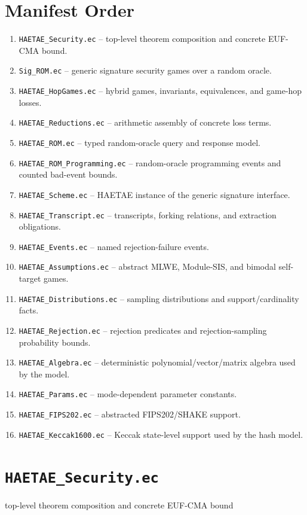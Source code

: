 \documentclass[10pt]{article}
\newcommand{\file}[1]{\nolinkurl{#1}}
\begin{document}
\section{Manifest Order}
\begin{enumerate}
\item \file{HAETAE\_Security.ec} -- top-level theorem composition and concrete EUF-CMA bound.
\item \file{Sig\_ROM.ec} -- generic signature security games over a random oracle.
\item \file{HAETAE\_HopGames.ec} -- hybrid games, invariants, equivalences, and game-hop losses.
\item \file{HAETAE\_Reductions.ec} -- arithmetic assembly of concrete loss terms.
\item \file{HAETAE\_ROM.ec} -- typed random-oracle query and response model.
\item \file{HAETAE\_ROM\_Programming.ec} -- random-oracle programming events and counted bad-event bounds.
\item \file{HAETAE\_Scheme.ec} -- HAETAE instance of the generic signature interface.
\item \file{HAETAE\_Transcript.ec} -- transcripts, forking relations, and extraction obligations.
\item \file{HAETAE\_Events.ec} -- named rejection-failure events.
\item \file{HAETAE\_Assumptions.ec} -- abstract MLWE, Module-SIS, and bimodal self-target games.
\item \file{HAETAE\_Distributions.ec} -- sampling distributions and support/cardinality facts.
\item \file{HAETAE\_Rejection.ec} -- rejection predicates and rejection-sampling probability bounds.
\item \file{HAETAE\_Algebra.ec} -- deterministic polynomial/vector/matrix algebra used by the model.
\item \file{HAETAE\_Params.ec} -- mode-dependent parameter constants.
\item \file{HAETAE\_FIPS202.ec} -- abstracted FIPS202/SHAKE support.
\item \file{HAETAE\_Keccak1600.ec} -- Keccak state-level support used by the hash model.
\end{enumerate}

\clearpage
\section{\texorpdfstring{\texttt{HAETAE\_Security.ec}}{HAETAE Security.ec}}
top-level theorem composition and concrete EUF-CMA bound
\end{document}
